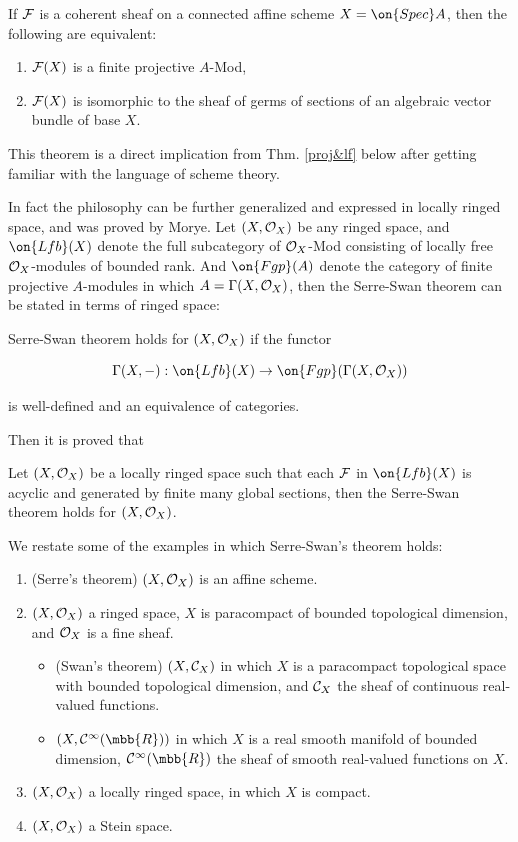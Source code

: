 \begin{thm}
	If $\mathcal{F}$ is a coherent sheaf on a connected affine scheme $X=\on{Spec}A$, then the following are equivalent:
	\begin{enumerate}
		\item $\mathcal{F}(X)$ is a finite projective $A$-Mod,
		\item $\mathcal{F}(X)$ is isomorphic to the sheaf of germs of sections of an algebraic vector bundle of base $X$.
	\end{enumerate}
\end{thm}

This theorem is a direct implication from Thm. \ref{proj&lf} below after getting familiar with the language of scheme theory.


In fact the philosophy can be further generalized and expressed in locally ringed space, and was proved by Morye\cite{Morye2013}. Let $(X,\mathcal{O}_X)$ be any ringed space, and $\on{Lfb}(X)$ denote the full subcategory of $\mathcal{O}_X$-Mod consisting of locally free $\mathcal{O}_X$-modules of bounded rank. And $\on{Fgp}(A)$ denote the category of finite projective $A$-modules in which $A=\Gamma(X,\mathcal{O}_X)$, then the Serre-Swan theorem can be stated in terms of ringed space:
\begin{dfn}
	Serre-Swan theorem holds for $(X,\mathcal{O}_X)$ if the functor 
	
	$$
	\Gamma(X,-):\on{Lfb}(X)\rightarrow\on{Fgp}(\Gamma(X,\mcal{O}_X))
	$$
	
	is well-defined and an equivalence of categories.
\end{dfn}
Then it is proved that
\begin{thm}
	Let $(X,\mathcal{O}_X)$ be a locally ringed space such that each $\mathcal{F}$ in $\on{Lfb}(X)$ is acyclic and generated by finite many global sections, then the Serre-Swan theorem holds for $(X,\mathcal{O}_X)$.
\end{thm}

We restate some of the examples in which Serre-Swan's theorem holds:
\begin{enumerate}
	\item (Serre's theorem) $(X,\mathcal{O}_X)$ is an affine scheme.
	\item $(X,\mathcal{O}_X)$ a ringed space, $X$ is paracompact of bounded topological dimension, and $\mathcal{O}_X$ is a fine sheaf.
		\begin{itemize}
			\item (Swan's theorem) $(X,\mathcal{C}_X)$ in which $X$ is a paracompact topological space with bounded topological dimension, and $\mathcal{C}_X$ the sheaf of continuous real-valued functions.
			\item $(X,\mcal{C}^\infty(\mbb{R}))$ in which $X$ is a real smooth manifold of bounded dimension, $\mcal{C}^\infty(\mbb{R})$ the sheaf of smooth real-valued functions on $X$.
		\end{itemize}
	\item $(X,\mathcal{O}_X)$ a locally ringed space, in which $X$ is compact.
	\item $(X,\mathcal{O}_X)$ a Stein space.
\end{enumerate}


